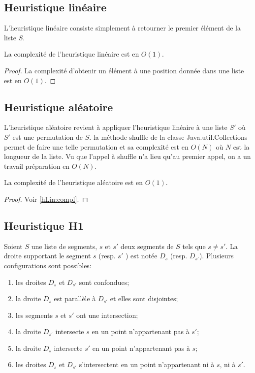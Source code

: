 \subsection{Heuristique linéaire}
L'heuristique linéaire consiste simplement à retourner le premier élément de la liste $S$.

\begin{prop}\label{hLin:compl}
 La complexité de l'heuristique linéaire est en $O(1)$.
\end{prop}
\begin{proof}
  La complexité d'obtenir un élément à une position donnée dans une liste est en $O(1)$.  
\end{proof}

\subsection{Heuristique aléatoire}

L'heuristique aléatoire revient à appliquer l'heuristique linéaire à une liste $S'$
où $S'$ est une permutation de $S$. la méthode shuffle de la classe Java.util.Collections permet de faire
une telle permutation et sa complexité est en $O(N)$ où $N$ est la longueur de la liste.
Vu que l'appel à shuffle n'a lieu qu'au premier appel, on a un travail préparation en $O(N)$.

\begin{prop}
 La complexité de l'heuristique aléatoire est  en $O(1)$.
\end{prop}
\begin{proof}
  Voir \ref{hLin:compl}.  
\end{proof}


\subsection{Heuristique H1}
Soient $S$ une liste de segments, $s$ et $s'$ deux segments
de $S$ tels que $s \ne s'$. La droite supportant le segment $s$ (resp. $s'$
) est notée $D_s$ (resp. $D_{s'}$).
Plusieurs configurations sont possibles:
\begin{enumerate}
\item les droites  $D_s$ et  $D_{s'}$ sont confondues; \label{h1:enum1}
\item la droite $D_s$ est parallèle à $D_{s'} $ et elles sont disjointes; \label{h1:enum2}
\item les segments $s$ et $s'$ ont une intersection; \label{h1:enum3}
\item la droite $D_{s'}$ intersecte $s$ en un point
  n'appartenant pas à $s'$;\label{h1:enum4}
\item la droite $D_{s}$ intersecte $s'$ en un point
  n'appartenant pas à $s$; \label{h1:enum5}
\item les droites $D_s$ et $D_{s'}$ s'intersectent en un point n'appartenant ni
  à $s$, ni à $s'$. \label{h1:enum6}
\end{enumerate}

